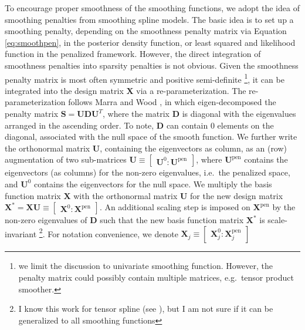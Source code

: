 \documentclass[AMA,STIX1COL,]{WileyNJD-v2}
\begin{document}
To encourage proper smoothness of the smoothing functions, we adopt the
idea of smoothing penalties from smoothing spline models. The basic idea
is to set up a smoothing penalty, depending on the smoothness penalty
matrix via Equation \ref{eq:smoothpen}, in the posterior density
function, or least squared and likelihood function in the penalized
framework. However, the direct integration of smoothness penalties into
sparsity penalties is not obvious. Given the smoothness penalty matrix
is most often symmetric and positive semi-definite \footnote{ we limit
  the discussion to univariate smoothing function. However, the penalty
  matrix could possibly contain multiple matrices, e.g.~tensor product
  smoother.}, it can be integrated into the design matrix
\(\boldsymbol{X}\) via a re-parameterization. The re-parameterization
follows Marra and Wood \citep{Marra2011}, in which eigen-decomposed the
penalty matrix
\(\boldsymbol{S} = \boldsymbol{U} \boldsymbol{D} \boldsymbol{U}^T\),
where the matrix \(\boldsymbol{D}\) is diagonal with the eigenvalues
arranged in the ascending order. To note, \(\boldsymbol{D}\) can contain
\(0\) elements on the diagonal, associated with the null space of the
smooth function. We further write the orthonormal matrix
\(\boldsymbol{U}\), containing the eigenvectors as column, as an (row)
augmentation of two sub-matrices
\(\boldsymbol{U} \equiv \begin{bmatrix}\boldsymbol{U}^0 : \boldsymbol{U}^{\text{pen}}\end{bmatrix}\),
where \(\boldsymbol{U}^{\text{pen}}\) contains the eigenvectors (as
columns) for the non-zero eigenvalues, i.e.~the penalized space, and
\(\boldsymbol{U}^0\) contains the eigenvectors for the null space. We
multiply the basis function matrix \(\boldsymbol{X}\) with the
orthonormal matrix \(\boldsymbol{U}\) for the new design matrix
\(\boldsymbol{X}^\ast = \boldsymbol{X} \boldsymbol{U} \equiv \begin{bmatrix} \boldsymbol{X}^0 : \boldsymbol{X}^{\text{pen}} \end{bmatrix}\).
An additional scaling step is imposed on \(\boldsymbol{X}^{\text{pen}}\)
by the non-zero eigenvalues of \(\boldsymbol{D}\) such that the new
basis function matrix \(\boldsymbol{X}^\ast\) is scale-invariant
\footnote{ I know this work for tensor spline (see \citep{Wood2006}),
  but I am not sure if it can be generalized to all smoothing functions}.
For notation convenience, we denote
\(\boldsymbol{X}_j \equiv \begin{bmatrix} \boldsymbol{X}_j^0 : \boldsymbol{X}_j^{\text{pen}} \end{bmatrix}\)
\end{document}
